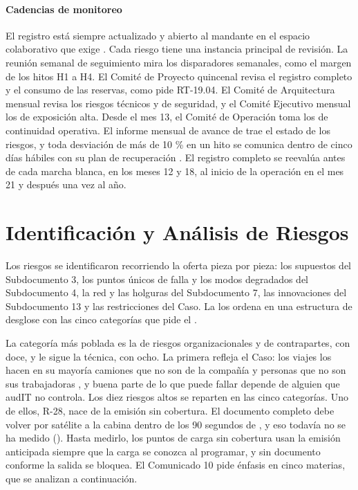 \paragraph{Cadencias de monitoreo}
El registro está siempre actualizado y abierto al mandante en el espacio colaborativo que exige
. Cada riesgo tiene una instancia principal de revisión. La reunión semanal de seguimiento mira
los disparadores semanales, como el margen de los hitos H1 a H4. El Comité de Proyecto quincenal revisa
el registro completo y el consumo de las reservas, como pide RT-19.04. El Comité de Arquitectura mensual
revisa los riesgos técnicos y de seguridad, y el Comité Ejecutivo mensual los de exposición alta. Desde
el mes 13, el Comité de Operación  toma los de continuidad operativa. El informe mensual de
avance de  trae el estado de los riesgos, y toda desviación de más de 10 \% en un
hito se comunica dentro de cinco días hábiles con su plan de recuperación . El
registro completo se reevalúa antes de cada marcha blanca, en los meses 12 y 18, al inicio de la
operación en el mes 21 y después una vez al año.

\section{Identificación y Análisis de Riesgos}\label{sec:8-identificacion}

Los riesgos se identificaron recorriendo la oferta pieza por pieza: los supuestos del Subdocumento 3,
los puntos únicos de falla y los modos degradados del Subdocumento 4, la red y las holguras del
Subdocumento 7, las innovaciones del Subdocumento 13 y las restricciones del Caso. La  los
ordena en una estructura de desglose con las cinco categorías que pide el .


La categoría más poblada es la de riesgos organizacionales y de contrapartes, con doce, y le sigue la
técnica, con ocho. La primera refleja el Caso: los viajes los hacen en su mayoría camiones que no son de
la compañía y personas que no son sus trabajadoras , y buena parte de lo que
puede fallar depende de alguien que audIT no controla. Los diez riesgos altos se reparten en las cinco
categorías. Uno de ellos, R-28, nace de la emisión sin cobertura. El documento completo debe volver por
satélite a la cabina dentro de los 90 segundos de , y eso todavía no se ha medido
(). Hasta medirlo, los puntos de carga sin cobertura usan la emisión
anticipada siempre que la carga se conozca al programar, y sin documento conforme la salida se
bloquea. El Comunicado 10 pide énfasis en cinco materias, que se analizan a
continuación.

